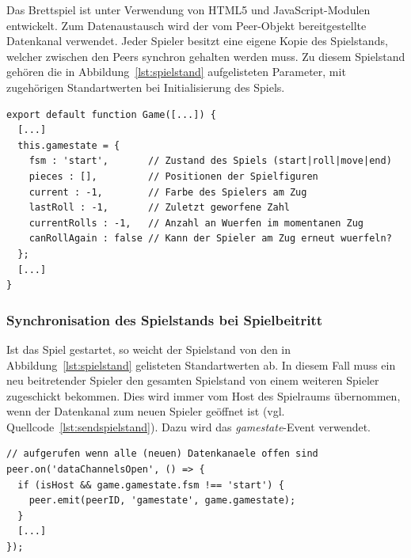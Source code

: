 Das Brettspiel ist unter Verwendung von \acf{HTML5} und JavaScript-Modulen entwickelt. Zum Datenaustausch wird der vom Peer-Objekt bereitgestellte Datenkanal verwendet. Jeder Spieler besitzt eine eigene Kopie des Spielstands, welcher zwischen den Peers synchron gehalten werden muss. Zu diesem Spielstand gehören die in Abbildung~\ref{lst:spielstand} aufgelisteten Parameter, mit zugehörigen Standartwerten bei Initialisierung des Spiels.

\vspace{5pt}
\lstset{language=js, style=STYLE_CODE_JS}
\begin{minipage}{\textwidth}
\begin{singlespace}
\begin{lstlisting}[caption={Spielstandsdaten -- Game.js}, captionpos=b, label={lst:spielstand}]
export default function Game([...]) {
  [...]
  this.gamestate = {
    fsm : 'start',       // Zustand des Spiels (start|roll|move|end)
    pieces : [],         // Positionen der Spielfiguren
    current : -1,        // Farbe des Spielers am Zug
    lastRoll : -1,       // Zuletzt geworfene Zahl
    currentRolls : -1,   // Anzahl an Wuerfen im momentanen Zug
    canRollAgain : false // Kann der Spieler am Zug erneut wuerfeln?
  };
  [...]
}
\end{lstlisting}
\end{singlespace}
\end{minipage}

\subsubsection{Synchronisation des Spielstands bei Spielbeitritt}
Ist das Spiel gestartet, so weicht der Spielstand von den in Abbildung~\ref{lst:spielstand} gelisteten Standartwerten ab. In diesem Fall muss ein neu beitretender Spieler den gesamten Spielstand von einem weiteren Spieler zugeschickt bekommen. Dies wird immer vom Host des Spielraums übernommen, wenn der Datenkanal zum neuen Spieler geöffnet ist (vgl. Quellcode~\ref{lst:sendspielstand}). Dazu wird das \textit{gamestate}-Event verwendet.

\vspace{5pt}
\lstset{language=js, style=STYLE_CODE_JS}
\begin{minipage}{\textwidth}
\begin{singlespace}
\begin{lstlisting}[caption={Senden des Spielstands -- game.js}, captionpos=b, label={lst:sendspielstand}]
// aufgerufen wenn alle (neuen) Datenkanaele offen sind
peer.on('dataChannelsOpen', () => {
  if (isHost && game.gamestate.fsm !== 'start') {
    peer.emit(peerID, 'gamestate', game.gamestate);
  }
  [...]
});
\end{lstlisting}
\end{singlespace}
\end{minipage}

